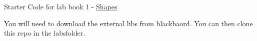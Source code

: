 Starter Code for lab book 1 -\/ \mbox{\hyperlink{class_shapes}{Shapes}}

You will need to download the external libs from blackbaord. You can then clone this repo in the labsfolder. 